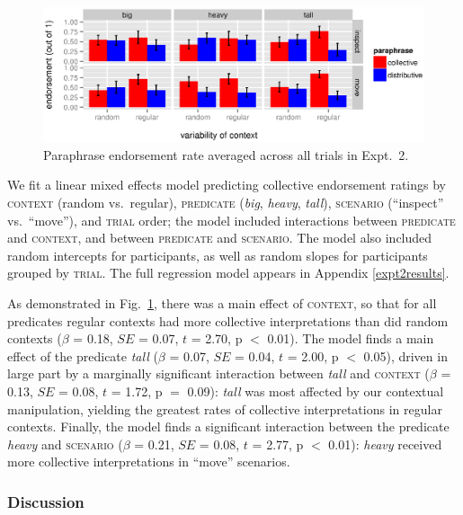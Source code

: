 \documentclass[linguex]{sp}
\begin{document}
\begin{figure}[h!]
	\centering
	\includegraphics[width=\linewidth]{plots/expt2rawbootsci.eps} 
	\vspace{-15pt}
	\caption{Paraphrase endorsement rate averaged across all trials in Expt.~2.}\label{resultsexpt2}
\end{figure}


We fit a linear mixed effects model predicting collective endorsement ratings by \textsc{context} (random vs.~regular),
\textsc{predicate} (\emph{big}, \emph{heavy}, \emph{tall}),
 \textsc{scenario} (``inspect'' vs.~``move''), and \textsc{trial} order; the model included interactions between \textsc{predicate} and \textsc{context}, and between \textsc{predicate} and \textsc{scenario}. The model also included random intercepts for participants, as well as random slopes for participants grouped by \textsc{trial}. The full regression model appears in Appendix \ref{expt2results}.

As demonstrated in Fig.~\ref{resultsexpt2}, there was a main effect of \textsc{context}, so that for all predicates regular contexts had more collective interpretations than did random contexts ($\beta$ = 0.18, $SE$ = 0.07, $t$ = 2.70, p $<$ 0.01). The model finds a main effect of the predicate \emph{tall} ($\beta$ = 0.07, $SE$ = 0.04, $t$ = 2.00, p $<$ 0.05), driven in large part by a marginally significant interaction between \emph{tall} and \textsc{context} ($\beta$ = 0.13, $SE$ = 0.08, $t$ = 1.72, p $=$ 0.09): \emph{tall} was most affected by our contextual manipulation, yielding the greatest rates of collective interpretations in regular contexts. Finally, the model finds a significant interaction between the predicate \emph{heavy} and \textsc{scenario} ($\beta$ = 0.21, $SE$ = 0.08, $t$ = 2.77, p $<$ 0.01): \emph{heavy} received more collective interpretations in ``move'' scenarios.

\subsubsection{Discussion}
\end{document}
